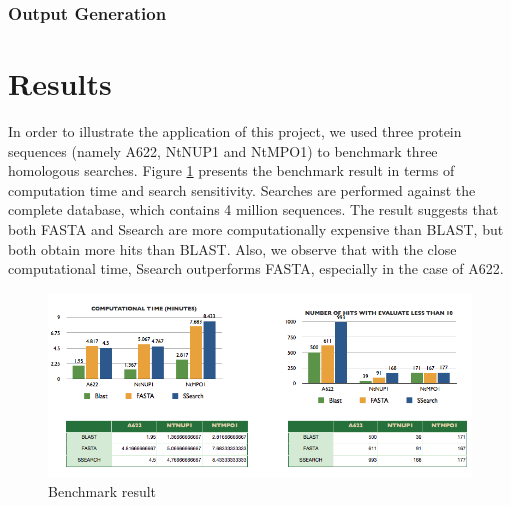 \documentclass[11pt,letterpaper,twoside,english]{article}
\begin{document}









\subsubsection{\label{sub:Output-Generation}Output Generation}




\section{Results}





In order to illustrate the application of this project, we used three
protein sequences (namely A622, NtNUP1 and NtMPO1) to benchmark three
homologous searches. Figure \ref{fig:Benchmark-result} presents the
benchmark result in terms of computation time and search sensitivity.
Searches are performed against the complete database, which contains
4 million sequences. The result suggests that both FASTA and Ssearch
are more computationally expensive than BLAST, but both obtain more
hits than BLAST. Also, we observe that with the close computational
time, Ssearch outperforms FASTA, especially in the case of A622.

%
\begin{figure}[H]
\begin{centering}
\includegraphics[width=0.8\linewidth]{figures/Bench_mark_result}
\par\end{centering}

\caption{\label{fig:Benchmark-result}Benchmark result}

\end{figure}
\end{document}
